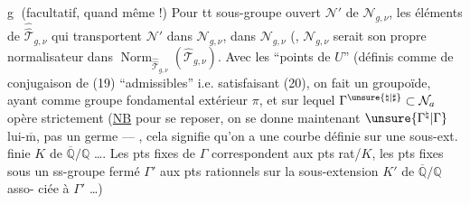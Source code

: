\textcircled{g} (facultatif, quand même !)
 Pour tt sous-groupe
ouvert $\mathcal N'$ de $\mathcal N_{g,\nu}$,
les éléments de $\widehat{\widehat{\mathcal T}}_{g,\nu}$
qui transportent
$\mathcal N'$ dans $\mathcal N_{g,\nu}$,  dans $\mathcal N_{g,\nu}$
(,
$\mathcal N_{g,\nu}$ serait son propre normalisateur
dans $\operatorname{Norm}_{\widehat{\widehat{\mathcal T}}_{g,\nu}}
(\widehat{\mathcal T}_{g,\nu})$.
Avec les ``points de $U$'' (définis comme 
de conjugaison de  (19)
``admissibles'' i.e. satisfaisant (20), on
fait un groupoïde, ayant comme
groupe fondamental extérieur $\pi$, et sur
lequel $\Gamma^{\unsure{\natural|\sharp}}\subset\mathcal N_a$ opère strictement
(\uline{NB} pour se reposer, on se donne
maintenant $\unsure{\Gamma^{\natural}|\Gamma}$ lui-$\overline{\mathrm m}$, pas  un
germe --- , cela signifie
qu'on a une courbe définie sur une
sous-ext. finie $K$ de $\overline{\mathbb Q}/\mathbb Q$ \ldots\unsure{\}|)}.
Les pts fixes de $\Gamma$ correspondent
aux pts rat/$K$, les pts fixes sous un
ss-groupe fermé $\Gamma'$ aux pts rationnels
sur la sous-extension $K'$ de $\overline{\mathbb Q}/\mathbb Q$ asso-
ciée à $\Gamma'$ \ldots)

